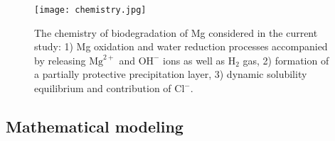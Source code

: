 \begin{figure}[h]
\centering
\medskip
\texttt{[image: chemistry.jpg]}
\caption[Simplified chemistry of biodegradation of Mg]{The chemistry of biodegradation of Mg considered in the current study: 1) Mg oxidation and water reduction processes accompanied by releasing $\mathrm{Mg}^{2+}$ and $\mathrm{OH}^{-}$  ions as well as $\mathrm{H}_2$ gas, 2) formation of a partially protective precipitation layer, 3) dynamic solubility equilibrium and contribution of $\mathrm{Cl}^{-}$.} \label{fig:chemistry}
\end{figure}


\subsection{Mathematical modeling}

